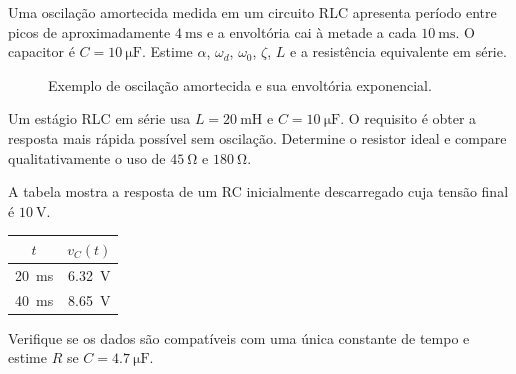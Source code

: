 \begin{questao}[4]{}

Uma oscilação amortecida medida em um circuito RLC apresenta período entre picos
de aproximadamente $\SI{4}{\milli\second}$ e a envoltória cai à metade a cada
$\SI{10}{\milli\second}$. O capacitor é $C=\SI{10}{\micro\farad}$. Estime
$\alpha$, $\omega_d$, $\omega_0$, $\zeta$, $L$ e a resistência equivalente em série.

\begin{figure}[H]
\centering
{}
\caption{Exemplo de oscilação amortecida e sua envoltória exponencial.}
\end{figure}



\end{questao}
\begin{questao}[4]{}

Um estágio RLC em série usa $L=\SI{20}{\milli\henry}$ e
$C=\SI{10}{\micro\farad}$. O requisito é obter a resposta mais rápida possível
sem oscilação. Determine o resistor ideal e compare qualitativamente o uso de
$\SI{45}{\ohm}$ e $\SI{180}{\ohm}$.


\end{questao}
\begin{questao}[4]{}

A tabela mostra a resposta de um RC inicialmente descarregado cuja tensão final é
$\SI{10}{\volt}$.

\begin{table}[H]
\centering\small\sffamily
\begin{tabular}{@{}c c@{}}
\toprule
$t$ & $v_C(t)$\\
\midrule
\SI{20}{\milli\second} & \SI{6.32}{\volt}\\
\SI{40}{\milli\second} & \SI{8.65}{\volt}\\
\bottomrule
\end{tabular}
\end{table}

Verifique se os dados são compatíveis com uma única constante de tempo e estime
$R$ se $C=\SI{4.7}{\micro\farad}$.


\end{questao}
